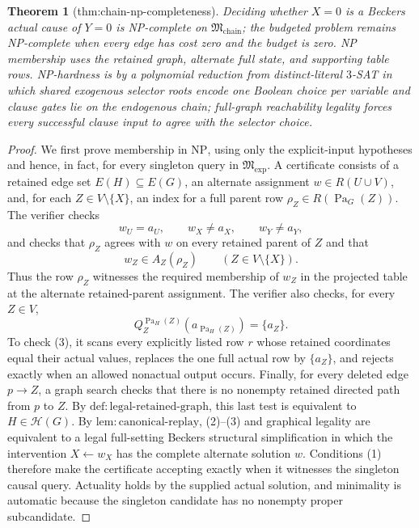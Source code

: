 \documentclass{article}
\newtheorem{theorem}{Theorem}
\begin{document}
\begin{theorem}[thm:chain-np-completeness]\label{thm:chain-np-completeness}
Deciding whether \(X=0\) is a Beckers actual cause of \(Y=0\) is NP-complete on \(\mathfrak M_{\mathrm{chain}}\); the budgeted problem remains NP-complete when every edge has cost zero and the budget is zero. NP membership uses the retained graph, alternate full state, and supporting table rows. NP-hardness is by a polynomial reduction from distinct-literal \(3\)-SAT in which shared exogenous selector roots encode one Boolean choice per variable and clause gates lie on the endogenous chain; full-graph reachability legality forces every successful clause input to agree with the selector choice.
\end{theorem}
\begin{proof}
We first prove membership in \(\mathrm{NP}\), using only the explicit-input hypotheses and hence, in fact, for every singleton query in \(\mathfrak M_{\mathrm{exp}}\).  A certificate consists of a retained edge set \(E(H)\subseteq E(G)\), an alternate assignment \(w\in R(U\cup V)\), and, for each \(Z\in V\setminus\{X\}\), an index for a full parent row \(\rho_Z\in R(\operatorname{Pa}_G(Z))\).  The verifier checks
\[
 w_U=a_U,\qquad w_X\ne a_X,\qquad w_Y\ne a_Y,                                      \tag{1}
\]
and checks that \(\rho_Z\) agrees with \(w\) on every retained parent of \(Z\) and that
\[
 w_Z\in A_Z(\rho_Z)\qquad (Z\in V\setminus\{X\}).                                  \tag{2}
\]
Thus the row \(\rho_Z\) witnesses the required membership of \(w_Z\) in the projected table at the alternate retained-parent assignment.  The verifier also checks, for every \(Z\in V\),
\[
 Q_Z^{\operatorname{Pa}_H(Z)}(a_{\operatorname{Pa}_H(Z)})=\{a_Z\}.                  \tag{3}
\]
To check (3), it scans every explicitly listed row \(r\) whose retained coordinates equal their actual values, replaces the one full actual row by \(\{a_Z\}\), and rejects exactly when an allowed nonactual output occurs.  Finally, for every deleted edge \(p\to Z\), a graph search checks that there is no nonempty retained directed path from \(p\) to \(Z\).  By \(\mathrm{def:legal\mbox{-}retained\mbox{-}graph}\), this last test is equivalent to \(H\in\mathcal H(G)\).  By \(\mathrm{lem:canonical\mbox{-}replay}\), (2)--(3) and graphical legality are equivalent to a legal full-setting Beckers structural simplification in which the intervention \(X\leftarrow w_X\) has the complete alternate solution \(w\).  Conditions (1) therefore make the certificate accepting exactly when it witnesses the singleton causal query.  Actuality holds by the supplied actual solution, and minimality is automatic because the singleton candidate has no nonempty proper subcandidate.


\end{proof}
\end{document}
